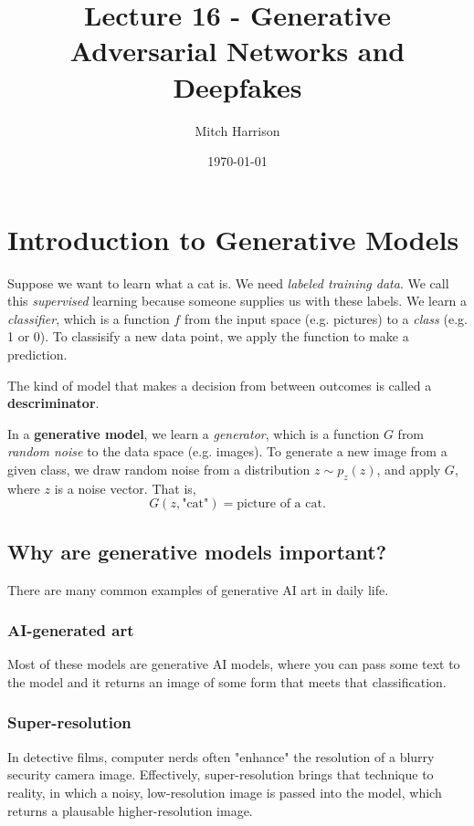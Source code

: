 \documentclass[titlepage, 12pt, leqno]{article}
\title{\Huge{Lecture 16 - Generative Adversarial Networks and Deepfakes}}
\author{\large{Mitch Harrison}}
\date{\today}
\begin{document}
\setlength{\parskip}{1\baselineskip}
\setlength{\parindent}{15pt}
\maketitle
\tableofcontents
\newpage


\section{Introduction to Generative Models}

Suppose we want to learn what a cat is. We need \textit{labeled training data}.
We call this \textit{supervised} learning because someone supplies us with these
labels. We learn a \textit{classifier}, which is a function $f$ from the
input space (e.g. pictures) to a \textit{class} (e.g. 1 or 0). To classisify a
new data point, we apply the function to make a prediction.

\begin{definition}
    The kind of model that makes a decision from between outcomes is called a
    \textbf{descriminator}.
\end{definition}
 
In a \textbf{generative model}, we learn a \textit{generator}, which is a
function $G$ from \textit{random noise} to the data space (e.g. images). To
generate a new image from a given class, we draw random noise from a distribution
$z \sim p_{z}(z)$, and apply $G$, where $z$ is a noise vector. That is,
\[
    G(z, \text{"cat"}) = \text{picture of a cat}.
\]
\subsection{Why are generative models important?}
There are many common examples of generative AI art in daily life. 

\subsubsection{AI-generated art}
Most of these models are generative AI models, where you can pass some text to
the model and it returns an image of some form that meets that classification.

\subsubsection{Super-resolution}
In detective films, computer nerds often "enhance" the resolution of a blurry
security camera image. Effectively, super-resolution brings that technique to
reality, in which a noisy, low-resolution image is passed into the model, which
returns a plausable higher-resolution image.
\end{document}
